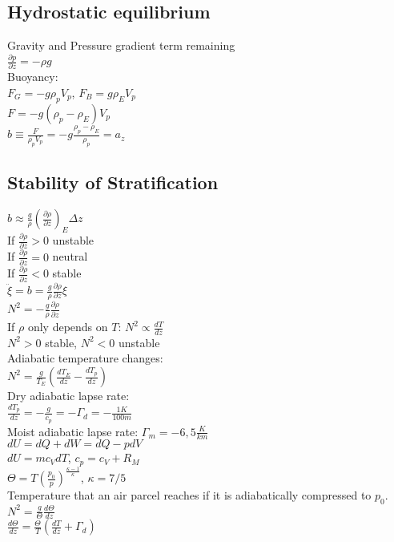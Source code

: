 \subsection*{Hydrostatic equilibrium}
Gravity and Pressure gradient term remaining\\
$\frac{\partial p}{\partial z}=-\rho g$\\
Buoyancy:\\
$F_G=-g\rho_pV_p$, $F_B=g\rho_EV_p$\\
$F=-g(\rho_p-\rho_E)V_p$\\
$b\equiv \frac{F}{\rho_p V_p}=-g\frac{\rho_p-\rho_E}{\rho_p}=a_z$
\subsection*{Stability of Stratification}
$b\approx\frac{g}{\rho}\left(\frac{\partial\rho}{\partial z}\right)_E \Delta z$\\
If $\frac{\partial\rho}{\partial z}>0$ unstable\\
If $\frac{\partial\rho}{\partial z}=0$ neutral\\
If $\frac{\partial\rho}{\partial z}<0$ stable\\
$\ddot{\xi}=b=\frac{g}{\rho}\frac{\partial\rho}{\partial z} \xi$\\
$N^2=-\frac{g}{\rho}\frac{\partial\rho}{\partial z}$\\
If $\rho$ only depends on $T$: $N^2\propto \frac{dT}{dz}$\\
$N^2>0$ stable, $N^2<0$ unstable\\
Adiabatic temperature changes:\\
$N^2=\frac{g}{T_E}\left(\frac{dT_E}{dz}-\frac{dT_p}{dz}\right)$\\
Dry adiabatic lapse rate:\\ $\frac{dT_p}{dz}=-\frac{g}{c_p}=-\Gamma_d=-\frac{1K}{100m}$\\
Moist adiabatic lapse rate: $\Gamma_m=-6,5\frac{K}{km}$\\
$dU=dQ+dW=dQ-pdV$\\
$dU=mc_V dT$, $c_p=c_V + R_M$\\
$\Theta=T\left(\frac{p_0}{p}\right)^{\frac{\kappa-1}{\kappa}}$, $\kappa = 7/5$\\
Temperature that an air parcel reaches if it is adiabatically compressed to $p_0$.\\
$N^2 = \frac{g}{\Theta}\frac{d\Theta}{dz}$\\
$\frac{d\Theta}{dz}=\frac{\Theta}{T}\left(\frac{dT}{dz}+\Gamma_d\right)$
